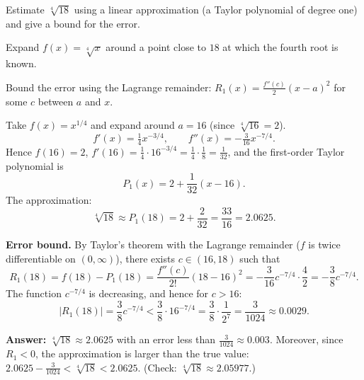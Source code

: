 
\begin{question}
Estimate $\sqrt[4]{18}$ using a linear approximation (a Taylor polynomial of degree one) and give a bound for the error.
\end{question}

\begin{hint}
Expand $f(x)=\sqrt[4]{x}$ around a point close to $18$ at which the fourth root is known.
\end{hint}

\begin{hint}
Bound the error using the Lagrange remainder: $R_1(x)=\frac{f''(c)}{2}(x-a)^2$ for some $c$ between $a$ and $x$.
\end{hint}

\begin{solution}
Take $f(x)=x^{1/4}$ and expand around $a=16$ (since $\sqrt[4]{16}=2$).
\[ f'(x)=\tfrac14x^{-3/4},\qquad f''(x)=-\tfrac{3}{16}x^{-7/4}. \]
Hence $f(16)=2$, $f'(16)=\frac14\cdot16^{-3/4}=\frac14\cdot\frac18=\frac1{32}$, and the first-order Taylor polynomial is
\[ P_1(x)=2+\frac{1}{32}(x-16). \]
The approximation:
\[ \sqrt[4]{18}\approx P_1(18)=2+\frac{2}{32}=\frac{33}{16}=2.0625. \]

\textbf{Error bound.} By Taylor's theorem with the Lagrange remainder ($f$ is twice differentiable on $(0,\infty)$), there exists $c\in(16,18)$ such that
\[ R_1(18)=f(18)-P_1(18)=\frac{f''(c)}{2!}(18-16)^2=-\frac{3}{16}c^{-7/4}\cdot\frac{4}{2}=-\frac{3}{8}c^{-7/4}. \]
The function $c^{-7/4}$ is decreasing, and hence for $c>16$:
\[ |R_1(18)|=\frac38c^{-7/4}<\frac38\cdot16^{-7/4}=\frac38\cdot\frac{1}{2^7}=\frac{3}{1024}\approx0.0029. \]

\textbf{Answer:} $\sqrt[4]{18}\approx2.0625$ with an error less than $\frac{3}{1024}\approx 0.003$. Moreover, since $R_1<0$, the approximation is larger than the true value:
$2.0625-\frac{3}{1024}<\sqrt[4]{18}<2.0625$.
(Check: $\sqrt[4]{18}\approx2.05977$.)
\end{solution}
